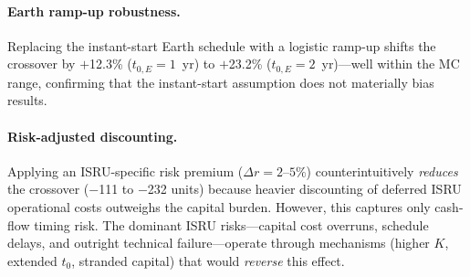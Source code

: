 \documentclass[5p,twocolumn]{elsarticle}
\begin{document}
\begin{table}[htbp]
\centering
\caption{Summary of robustness tests (NPV, $r = 5\%$, phased-$K$ baseline $N^* = 3{,}749$; lump-sum $N^* = 4{,}374$). Shifts reported relative to lump-sum baseline for comparison with previous versions.}
\label{tab:robustness_summary}
\small
{}
\end{table}

\paragraph{Earth ramp-up robustness.}
\label{sec:earth_ramp}
Replacing the instant-start Earth schedule with a logistic ramp-up shifts the crossover by $+$12.3\% ($t_{0,E} = 1$~yr) to $+$23.2\% ($t_{0,E} = 2$~yr)---well within the MC range, confirming that the instant-start assumption does not materially bias results.

\paragraph{Risk-adjusted discounting.}
\label{sec:risk_premium}
Applying an ISRU-specific risk premium ($\Delta r = 2$--$5\%$) counterintuitively \emph{reduces} the crossover ($-$111 to $-$232 units) because heavier discounting of deferred ISRU operational costs outweighs the capital burden. However, this captures only cash-flow timing risk. The dominant ISRU risks---capital cost overruns, schedule delays, and outright technical failure---operate through mechanisms (higher $K$, extended $t_0$, stranded capital) that would \emph{reverse} this effect.
\end{document}
